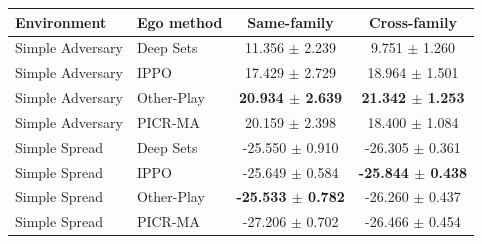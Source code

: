 \begin{tabular}{llcc}
\toprule
Environment & Ego method & Same-family & Cross-family \\
\midrule
Simple Adversary & Deep Sets & 11.356 $\pm$ 2.239 & 9.751 $\pm$ 1.260 \\
Simple Adversary & IPPO & 17.429 $\pm$ 2.729 & 18.964 $\pm$ 1.501 \\
Simple Adversary & Other-Play & \textbf{20.934 $\pm$ 2.639} & \textbf{21.342 $\pm$ 1.253} \\
Simple Adversary & PICR-MA & 20.159 $\pm$ 2.398 & 18.400 $\pm$ 1.084 \\
Simple Spread & Deep Sets & -25.550 $\pm$ 0.910 & -26.305 $\pm$ 0.361 \\
Simple Spread & IPPO & -25.649 $\pm$ 0.584 & \textbf{-25.844 $\pm$ 0.438} \\
Simple Spread & Other-Play & \textbf{-25.533 $\pm$ 0.782} & -26.260 $\pm$ 0.437 \\
Simple Spread & PICR-MA & -27.206 $\pm$ 0.702 & -26.466 $\pm$ 0.454 \\
\bottomrule
\end{tabular}
